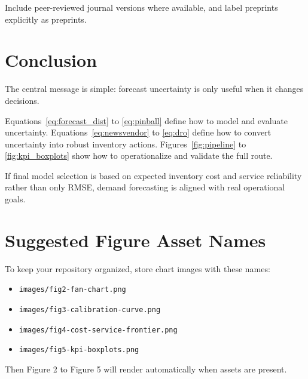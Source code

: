 \documentclass[11pt,a4paper]{article}
\begin{document}
Include peer-reviewed journal versions where available, and label preprints explicitly as preprints.

\section{Conclusion}

The central message is simple: forecast uncertainty is only useful when it changes decisions.

Equations~\eqref{eq:forecast_dist} to \eqref{eq:pinball} define how to model and evaluate uncertainty. Equations~\eqref{eq:newsvendor} to \eqref{eq:dro} define how to convert uncertainty into robust inventory actions. Figures~\ref{fig:pipeline} to \ref{fig:kpi_boxplots} show how to operationalize and validate the full route.

If final model selection is based on expected inventory cost and service reliability rather than only RMSE, demand forecasting is aligned with real operational goals.

\appendix
\section{Suggested Figure Asset Names}

To keep your repository organized, store chart images with these names:

\begin{itemize}
    \item \texttt{images/fig2-fan-chart.png}
    \item \texttt{images/fig3-calibration-curve.png}
    \item \texttt{images/fig4-cost-service-frontier.png}
    \item \texttt{images/fig5-kpi-boxplots.png}
\end{itemize}

Then Figure 2 to Figure 5 will render automatically when assets are present.
\end{document}
